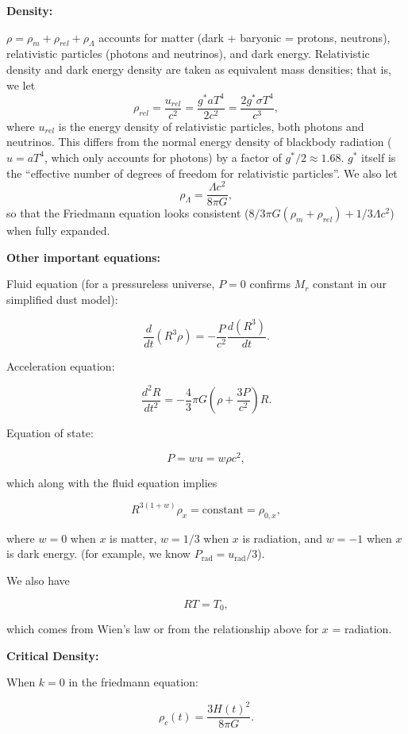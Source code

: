 \documentclass[11pt]{article}
\newcommand{\V}{

\vspace{\baselineskip}

}
\begin{document}
\textbf{Density:}

$\rho = \rho_{m} + \rho_{rel} + \rho_{\Lambda}$ accounts for matter (dark + baryonic = protons, neutrons), relativistic particles (photons and neutrinos), and dark energy. Relativistic density and dark energy density are taken as equivalent mass densities; that is, we let 
\[\rho_{rel} = \frac{u_{rel}}{c^{2}} = \frac{g^{*}aT^{4}}{2c^{2}} = \frac{2g^{*}\sigma T^{4}}{c^{3}},\]
where $u_{rel}$ is the energy density of relativistic particles, both photons and neutrinos. This differs from the normal energy density of blackbody radiation ($u=aT^{4}$, which only accounts for photons) by a factor of $g^{*}/2\approx 1.68$. $g^{*}$ itself is the ``effective number of degrees of freedom for relativistic particles''. We also let 
\[\rho_{\Lambda} = \frac{\Lambda c^{2}}{8\pi G},\]
so that the Friedmann equation looks consistent ($8/3\pi G(\rho_{m}+\rho_{rel}) + 1/3\Lambda c^{2}$) when fully expanded.\V

\textbf{Other important equations:}

Fluid equation (for a pressureless universe, $P=0$ confirms $M_{r}$ constant in our simplified dust model):

\[\frac{d}{dt}(R^{3}\rho) = -\frac{P}{c^{2}}\frac{d(R^{3})}{dt}.\]

Acceleration equation:

\[\frac{d^{2}R}{dt^{2}} = -\frac{4}{3}\pi G\left(\rho + \frac{3P}{c^{2}}\right)R.\]

Equation of state:

\[P = wu = w\rho c^{2},\]

which along with the fluid equation implies

\[R^{3(1+w)}\rho_{x} = \text{constant} = \rho_{0,x},\]

where $w=0$ when $x$ is matter, $w=1/3$ when $x$ is radiation, and $w=-1$ when $x$ is dark energy. (for example, we know $P_{\text{rad}} = u_{\text{rad}}/3$).

We also have 

\[RT = T_{0},\]

which comes from Wien's law or from the relationship above for $x$ = radiation.\V

\textbf{Critical Density:}

When $k=0$ in the friedmann equation:

\begin{equation*}
\rho_{c}(t) = \frac{3H(t)^{2}}{8\pi G}.
\end{equation*}\V
\end{document}
